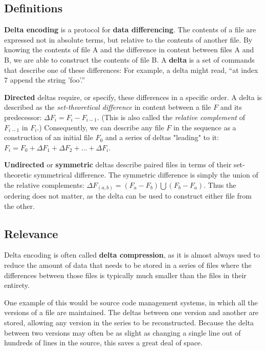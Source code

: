 \documentclass[12pt,a4paper]{article}
\begin{document}
		\subsection{Definitions}
		
		\textbf{Delta encoding} is a protocol for \textbf{data differencing}. The contents of a file are expressed not in absolute terms, but relative to the contents of another file. By knowing the contents of file A and the difference in content between files A and B, we are able to construct the contents of file B. A \textbf{delta} is a set of commands that describe one of these differences: For example, a delta might read, \textquotedblleft at index 7 append the string 'foo'.\textquotedblright
		
		\textbf{Directed} deltas require, or specify, these differences in a specific order. A delta is described as the \textit{set-theoretical difference} in content between a file $F$ and its predecessor: $\Delta F_i = F_i - F_{i-1}$. (This is also called the \textit{relative complement} of $F_{i-1}$ in $F_i$.) Consequently, we can describe any file $F$ in the sequence as a construction of an initial file $F_0$ and a series of deltas "leading" to it: $F_i = F_0 + \Delta F_1 + \Delta F_2 + ... + \Delta F_i$.
		
		\textbf{Undirected} or \textbf{symmetric} deltas describe paired files in terms of their set-theoretic symmetrical difference. The symmetric difference is simply the union of the relative complements: $\Delta F_{(a,b)} = (F_a - F_b) \bigcup (F_b - F_a)$. Thus the ordering does not matter, as the delta can be used to construct either file from the other.
		
		\subsection{Relevance}
		
		Delta encoding is often called \textbf{delta compression}, as it is almost always used to reduce the amount of data that needs to be stored in a series of files where the differences between those files is typically much smaller than the files in their entirety.
		
		One example of this would be source code management systems, in which all the versions of a file are maintained. The deltas between one version and another are stored, allowing any version in the series to be reconstructed. Because the delta between two versions may often be as slight as changing a single line out of hundreds of lines in the source, this saves a great deal of space.\cite{BenefitsDeltaEncodingHTTP,DeltaEncodingHTTP}
		
\end{document}
